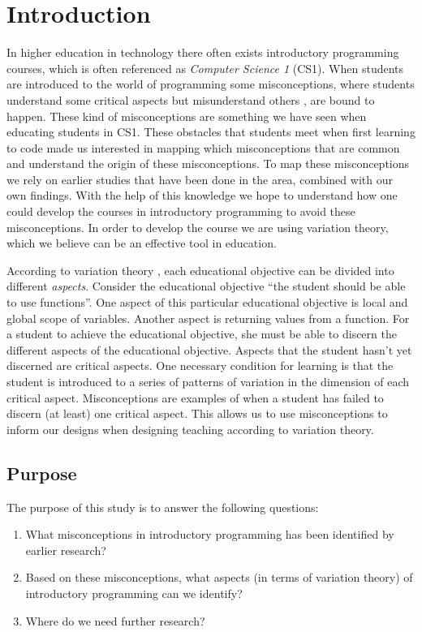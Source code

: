 \section{Introduction}


In higher education in technology there often exists introductory 
programming courses, which is often referenced as \emph{Computer Science 1} 
(CS1). When students are introduced to the world of programming some 
misconceptions, where students understand some critical aspects but 
misunderstand others \parencite{NCOL}, are bound to happen. These kind of 
misconceptions are something we have seen when educating students in CS1. 
These obstacles that students meet when first learning to code made us 
interested in mapping which misconceptions that are common and understand 
the origin of these misconceptions. To map these misconceptions we rely on 
earlier studies that have been done in the area, combined with our own 
findings. With the help of this knowledge we hope to understand how one 
could develop the courses in introductory programming to avoid these 
misconceptions. In order to develop the course we are using variation 
theory, which we believe can be an effective tool in education. 


According to variation theory \parencite[Ch.~2]{NCOL}, each educational 
objective can be divided into different \emph{aspects}.
Consider the educational objective \enquote{the student should be able to 
use 
functions}.
One aspect of this particular educational objective is local and global 
scope 
of variables.
Another aspect is returning values from a function.
For a student to achieve the educational objective, she must be able to 
discern 
the different aspects of the educational objective.
Aspects that the student hasn't yet discerned are critical aspects.
One necessary condition for learning is that the student is introduced to a 
series of patterns of variation in the dimension of each critical aspect.
Misconceptions are examples of when a student has failed to discern (at 
least) 
one critical aspect.
This allows us to use misconceptions to inform our designs when designing 
teaching according to variation theory.

\subsection{Purpose}

The purpose of this study is to answer the following questions:
\begin{enumerate}
  \item What misconceptions in introductory programming has been identified 
by 
    earlier research?
  \item Based on these misconceptions, what aspects (in terms of variation 
    theory) of introductory programming can we identify?
  \item Where do we need further research?
\end{enumerate}